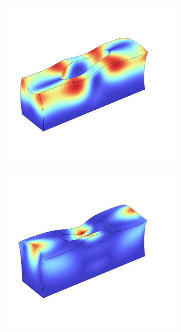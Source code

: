 \begin{figure}[htpb]
\begin{subfigure}[]{0.24\textwidth}
\begin{center}
		\end{center}
		\subcaption{}%
		\label{fig:ms6}
	\end{subfigure}
	\begin{subfigure}[]{0.24\textwidth}
		\begin{center}
			\includegraphics[width=\textwidth]{chapters/theory/modeshape_7.png}
		\end{center}
		\subcaption{}%
		\label{fig:ms7}
	\end{subfigure}
	\begin{subfigure}[]{0.24\textwidth}
		\begin{center}
			\includegraphics[width=\textwidth]{chapters/theory/modeshape_8.png}
		\end{center}
		\subcaption{}%
		\label{fig:ms8}
	\end{subfigure}


\end{figure}
